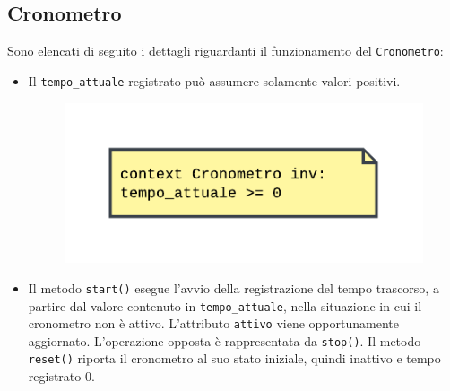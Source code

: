 \documentclass[11pt, a4paper]{article}
\theoremstyle{definition} %
\begin{document}
\subsection{Cronometro}
Sono elencati di seguito i dettagli riguardanti il funzionamento del
\texttt{Cronometro}:
\begin{itemize}
    \item Il \texttt{tempo\_attuale} registrato può assumere solamente
    valori positivi.

    \begin{figure}[H]
    \centering
    \includegraphics[scale = 0.8]{materiale/ocl-tempo.pdf}
    \end{figure}

    \item Il metodo \texttt{start()} esegue l'avvio della registrazione
    del tempo trascorso, a partire dal valore contenuto in
    \texttt{tempo\_attuale}, nella situazione in cui il cronometro non è
    attivo. L'attributo \texttt{attivo} viene opportunamente aggiornato.
    L'operazione opposta è rappresentata da \texttt{stop()}. Il
    metodo \texttt{reset()} riporta il cronometro al suo stato iniziale,
    quindi inattivo e tempo registrato 0.


\end{itemize}
\end{document}
